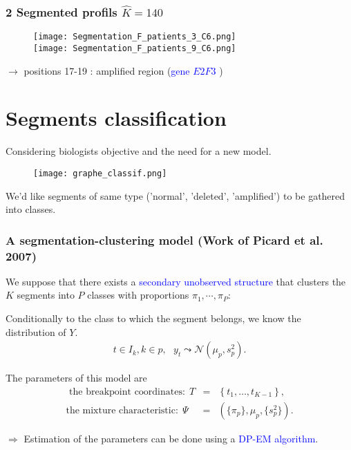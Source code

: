 \documentclass[compress]{beamer}
\begin{document}
\begin{frame}
\frametitle{2 Segmented profils $\hat K=140$ }
\begin{figure}
\texttt{[image: Segmentation\_F\_patients\_3\_C6.png]}\\
\texttt{[image: Segmentation\_F\_patients\_9\_C6.png]}
\end{figure}
$\rightarrow$ positions 17-19 : amplified region (\textcolor{blue}{gene $E2F3$ })
\end{frame}




\section{Segments classification}
\begin{frame}
Considering biologists objective and the need for a new model.
\begin{figure}
\begin{center}
\texttt{[image: graphe\_classif.png]}
\end{center}
\end{figure}
We'd like segments of same type ('normal', 'deleted', 'amplified') to be gathered into classes.
\end{frame}


\begin{frame}
\frametitle{A segmentation-clustering model (Work of Picard et al. 2007)}
\begin{dinglist}{42}
\item We suppose that there exists a \textcolor{blue}{secondary unobserved structure} that clusters the $K$ segments into $P$ classes with proportions $\pi_1,\cdots,\pi_P$:
\item Conditionally to the class to which the segment belongs, we know the distribution of $Y$.
\begin{eqnarray*}
t\in I_{k}, k\in p, \ \ \ y_{t} \leadsto \mathcal{N}(\mu_p, s_p^2).
\end{eqnarray*}
\item The parameters of this model are
\begin{eqnarray*}
\mbox{ the breakpoint coordinates:} \ \ T  &= &\left\{t_1,\ldots,t_{K-1}\right\},\\ 
\mbox{the mixture characteristic:}\ \  \Psi &= &(\{\pi_p\},{\mu_p}, \{s_p^2\}). 
\end{eqnarray*}
\end{dinglist}
$\Rightarrow$ Estimation of the parameters can be done using a \textcolor{blue}{DP-EM algorithm}.
\end{frame}
\end{document}

